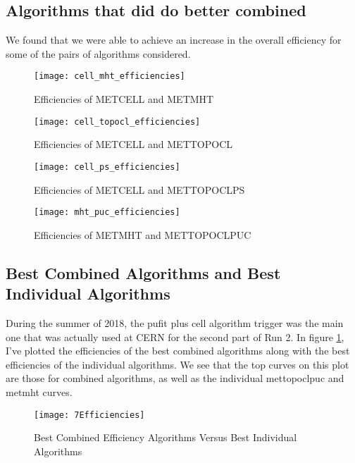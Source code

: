 \subsection{Algorithms that did do better combined}
We found that we were able to achieve an increase in the overall efficiency for some of the pairs of algorithms considered. 
\begin{figure}[h]
        \centering
        \texttt{[image: cell\_mht\_efficiencies]}
        \caption{Efficiencies of METCELL and METMHT}
\end{figure}
\begin{figure}[h]
        \centering
        \texttt{[image: cell\_topocl\_efficiencies]}
        \caption{Efficiencies of METCELL and METTOPOCL}
\end{figure}
\begin{figure}[h]
        \centering
        \texttt{[image: cell\_ps\_efficiencies]}
        \caption{Efficiencies of METCELL and METTOPOCLPS}
\end{figure}
\begin{figure}[h]
        \centering
        \texttt{[image: mht\_puc\_efficiencies]}
        \caption{Efficiencies of METMHT and METTOPOCLPUC}
\end{figure}
\clearpage
\subsection{Best Combined Algorithms and Best Individual Algorithms}
During the summer of 2018, the pufit plus cell algorithm trigger was the main one that was actually used at CERN for the second part of Run 2.
In figure \ref{bisection_fig}, I've plotted the efficiencies of the best combined algorithms along with the best efficiencies of the individual algorithms. We see that the top curves on this plot are those for combined algorithms, as well as the individual mettopoclpuc and metmht curves.
\begin{figure}[h]
        \centering
        \texttt{[image: 7Efficiencies]}
        \caption{Best Combined Efficiency Algorithms Versus Best Individual Algorithms}
        \label{bisection_fig}
\end{figure}
\clearpage
